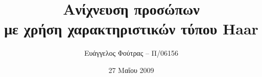 \documentclass{beamer}
\title[Ανίχνευση προσώπων με Haar-like χαρακτηριστικά]{Ανίχνευση προσώπων\\με χρήση χαρακτηριστικών
	τύπου Haar}
\author{Ευάγγελος Φούτρας -- Π/06156}
\institute{Πανεπιστήμιο Πειραιώς}
\date{27 Μαΐου 2009}
\begin{document}
\begin{frame}
\titlepage
\end{frame}

\begin{frame}

\end{frame}
\end{document}
